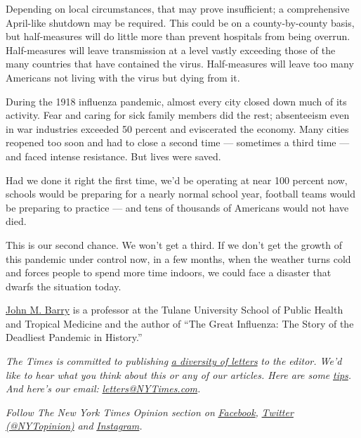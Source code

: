 Depending on local circumstances, that may prove insufficient; a
comprehensive April-like shutdown may be required. This could be on a
county-by-county basis, but half-measures will do little more than
prevent hospitals from being overrun. Half-measures will leave
transmission at a level vastly exceeding those of the many countries
that have contained the virus. Half-measures will leave too many
Americans not living with the virus but dying from it.

During the 1918 influenza pandemic, almost every city closed down much
of its activity. Fear and caring for sick family members did the rest;
absenteeism even in war industries exceeded 50 percent and eviscerated
the economy. Many cities reopened too soon and had to close a second
time --- sometimes a third time --- and faced intense resistance. But
lives were saved.

Had we done it right the first time, we'd be operating at near 100
percent now, schools would be preparing for a nearly normal school year,
football teams would be preparing to practice --- and tens of thousands
of Americans would not have died.

This is our second chance. We won't get a third. If we don't get the
growth of this pandemic under control now, in a few months, when the
weather turns cold and forces people to spend more time indoors, we
could face a disaster that dwarfs the situation today.

\href{http://www.johnmbarry.com/index.htm}{John M. Barry} is a professor
at the Tulane University School of Public Health and Tropical Medicine
and the author of ``The Great Influenza: The Story of the Deadliest
Pandemic in History.''

\emph{The Times is committed to publishing}
\href{https://www.nytimes3xbfgragh.onion/2019/01/31/opinion/letters/letters-to-editor-new-york-times-women.html}{\emph{a
diversity of letters}} \emph{to the editor. We'd like to hear what you
think about this or any of our articles. Here are some}
\href{https://help.nytimes3xbfgragh.onion/hc/en-us/articles/115014925288-How-to-submit-a-letter-to-the-editor}{\emph{tips}}\emph{.
And here's our email:}
\href{mailto:letters@NYTimes.com}{\emph{letters@NYTimes.com}}\emph{.}

\emph{Follow The New York Times Opinion section on}
\href{https://www.facebookcorewwwi.onion/nytopinion}{\emph{Facebook}}\emph{,}
\href{http://twitter.com/NYTOpinion}{\emph{Twitter (@NYTopinion)}}
\emph{and}
\href{https://www.instagram.com/nytopinion/}{\emph{Instagram}}\emph{.}

